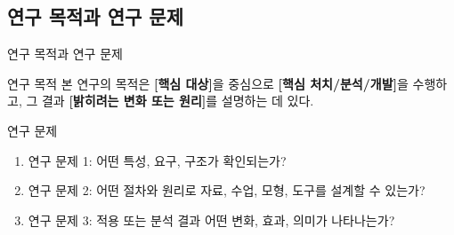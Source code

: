 \subsection{연구 목적과 연구 문제}
\begin{frame}[t]{연구 목적과 연구 문제}
\small

\begin{block}{연구 목적}
본 연구의 목적은 \textbf{[핵심 대상]}을 중심으로 \textbf{[핵심 처치/분석/개발]}을 수행하고, 그 결과 \textbf{[밝히려는 변화 또는 원리]}를 설명하는 데 있다.
\end{block}

\begin{exampleblock}{연구 문제}
\begin{enumerate}
\tightitems

\item 연구 문제 1: 어떤 특성, 요구, 구조가 확인되는가?
\item 연구 문제 2: 어떤 절차와 원리로 자료, 수업, 모형, 도구를 설계할 수 있는가?
\item 연구 문제 3: 적용 또는 분석 결과 어떤 변화, 효과, 의미가 나타나는가?
\end{enumerate}
\end{exampleblock}

\end{frame}
